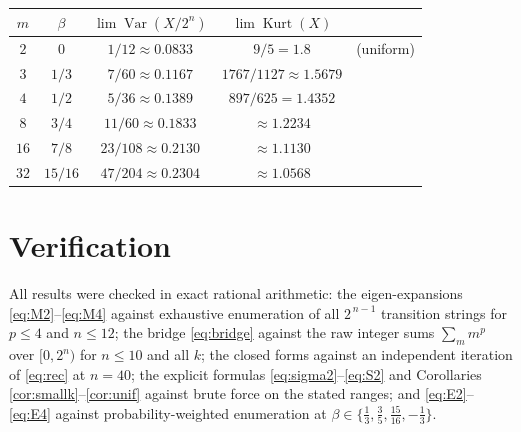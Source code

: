 \documentclass[11pt]{article}
\theoremstyle{remark}
\newcommand{\Var}{\operatorname{Var}}
\newcommand{\Kurt}{\operatorname{Kurt}}
\begin{document}
\begin{center}
\begin{tabular}{ccccc}
\toprule
$m$ & $\beta$ & $\lim \Var(X/2^n)$ & $\lim \Kurt(X)$ & \\
\midrule
$2$ & $0$ & $1/12 \approx 0.0833$ & $9/5 = 1.8$ & (uniform)\\
$3$ & $1/3$ & $7/60 \approx 0.1167$ & $1767/1127 \approx 1.5679$ &\\
$4$ & $1/2$ & $5/36 \approx 0.1389$ & $897/625 = 1.4352$ &\\
$8$ & $3/4$ & $11/60 \approx 0.1833$ & $\approx 1.2234$ &\\
$16$ & $7/8$ & $23/108 \approx 0.2130$ & $\approx 1.1130$ &\\
$32$ & $15/16$ & $47/204 \approx 0.2304$ & $\approx 1.0568$ &\\
\bottomrule
\end{tabular}
\end{center}

\section{Verification}

All results were checked in exact rational arithmetic:
the eigen-expansions \eqref{eq:M2}--\eqref{eq:M4} against exhaustive enumeration of all
$2^{\,n-1}$ transition strings for $p \le 4$ and $n \le 12$;
the bridge \eqref{eq:bridge} against the raw integer sums $\sum_{m} m^p$ over $[0, 2^n)$ for
$n \le 10$ and all $k$;
the closed forms against an independent iteration of \eqref{eq:rec} at $n = 40$;
the explicit formulas \eqref{eq:sigma2}--\eqref{eq:S2} and Corollaries
\ref{cor:smallk}--\ref{cor:unif} against brute force on the stated ranges;
and \eqref{eq:E2}--\eqref{eq:E4} against probability-weighted enumeration at
$\beta \in \{ \tfrac13, \tfrac35, \tfrac{15}{16}, -\tfrac13 \}$.
\end{document}
